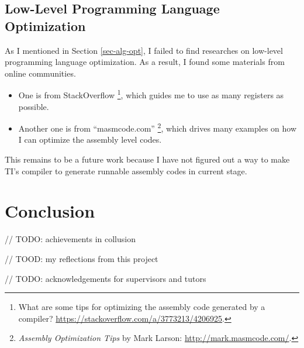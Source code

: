 \documentclass[sigconf, review=false]{acmart}
\begin{document}
\subsection{Low-Level Programming Language Optimization} \label{sec-low}
As I mentioned in Section \ref{sec-alg-opt}, I failed to find researches on low-level programming language optimization.
As a result, I found some materials from online communities.

\begin{itemize}
    \item One is from StackOverflow \footnote{What are some tips for optimizing the assembly code generated by a compiler? \url{https://stackoverflow.com/a/3773213/4206925}.},
          which guides me to use as many registers as possible.
    \item Another one is from ``masmcode.com'' \footnote{\textit{Assembly Optimization Tips} by Mark Larson: \url{http://mark.masmcode.com/}.},
          which drives many examples on how I can optimize the assembly level codes.
\end{itemize}

This remains to be a future work because I have not figured out a way to make TI's compiler to generate runnable assembly codes in current stage.


\section{Conclusion}
// TODO: achievements in collusion

// TOOD: my reflections from this project

// TODO: acknowledgements for supervisors and tutors





\end{document}
